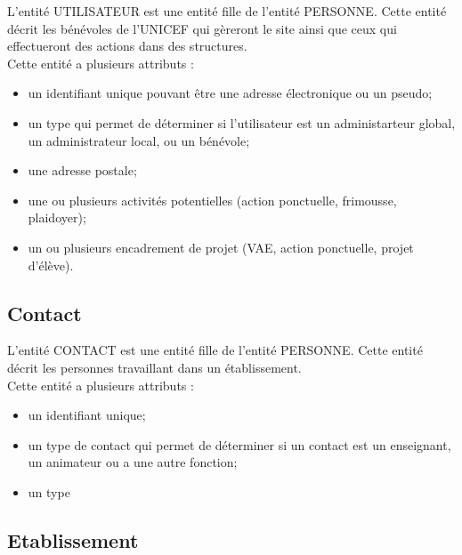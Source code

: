 \documentclass[asi, sansVersion]{picINSA}
\begin{document}
L'entité UTILISATEUR est une entité fille de l'entité PERSONNE. Cette entité décrit les bénévoles de l'UNICEF qui gèreront le site ainsi que ceux qui effectueront des actions dans des structures. \\
Cette entité a plusieurs attributs : 
\begin{itemize}
\item un identifiant unique pouvant être une adresse électronique ou un pseudo;  
\item un type qui permet de déterminer si l'utilisateur est un administarteur global, un administrateur local, ou un bénévole;
\item une adresse postale;
\item une ou plusieurs activités potentielles (action ponctuelle, frimousse, plaidoyer); %
\item un ou plusieurs encadrement de projet (VAE, action ponctuelle, projet d'élève). %
\end{itemize}

\subsection*{Contact}

L'entité CONTACT est une entité fille de l'entité PERSONNE. Cette entité décrit les personnes travaillant dans un établissement. \\
Cette entité a plusieurs attributs : 
\begin{itemize}
\item un identifiant unique;
\item un type de contact qui permet de déterminer si un contact est un enseignant, un animateur ou a une autre fonction; 
\item un type 
\end{itemize} 

\subsection*{Etablissement}
\end{document}
